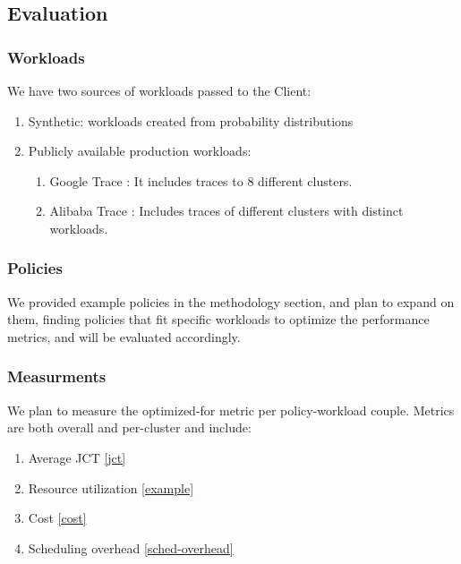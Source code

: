 \subsection{Evaluation}
\subsubsection{Workloads}
We have two sources of workloads passed to the Client:
\begin{enumerate}
    \item Synthetic: workloads created from probability distributions
    \item Publicly available production workloads: 
        \begin{enumerate}
            \item Google Trace \cite{google-cluster-data2019}: It includes traces to 8 different clusters. 
            \item Alibaba Trace \cite{alibabaclusterdata_2023}: Includes traces of different clusters with distinct workloads.        \end{enumerate}
\end{enumerate}

\subsubsection{Policies}
We provided example policies in the methodology section, and plan to expand on them, finding policies that  
fit specific workloads to optimize the performance metrics, and will be evaluated accordingly. 

\subsubsection{Measurments}
We plan to measure the optimized-for metric per policy-workload couple. 
Metrics are both overall and per-cluster and include:
\begin{enumerate}
    \item Average JCT \ref{jct}
    \item Resource utilization \ref{example} 
    \item Cost \ref{cost} 
    \item Scheduling overhead \ref{sched-overhead}
\end{enumerate}